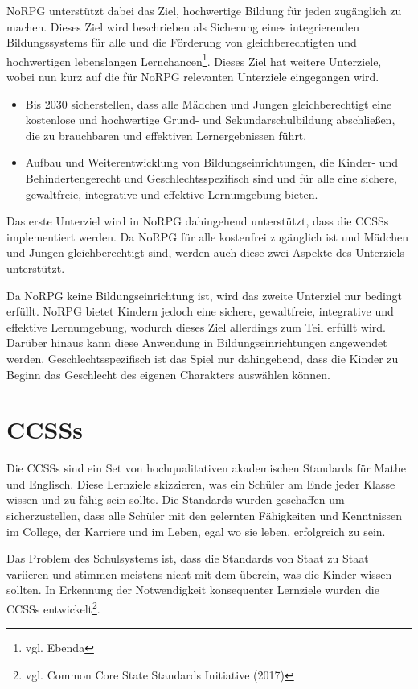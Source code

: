 NoRPG unterstützt dabei das Ziel, hochwertige Bildung für jeden zugänglich zu machen. Dieses Ziel wird beschrieben als Sicherung eines integrierenden Bildungssystems für alle und die Förderung von gleichberechtigten und hochwertigen lebenslangen Lernchancen\footnote{vgl. Ebenda}. Dieses Ziel hat weitere Unterziele, wobei nun kurz auf die für NoRPG relevanten Unterziele eingegangen wird.

\begin{itemize}
\item Bis 2030 sicherstellen, dass alle Mädchen und Jungen gleichberechtigt eine kostenlose und hochwertige Grund- und Sekundarschulbildung abschließen, die zu brauchbaren und effektiven Lernergebnissen führt.

\item Aufbau und Weiterentwicklung von Bildungseinrichtungen, die Kinder- und Behindertengerecht und Geschlechtsspezifisch sind und für alle eine sichere, gewaltfreie, integrative und effektive Lernumgebung bieten.
\end{itemize}

Das erste Unterziel wird in NoRPG dahingehend unterstützt, dass die \acfp{CCSS} implementiert werden. Da NoRPG für alle kostenfrei zugänglich ist und Mädchen und Jungen gleichberechtigt sind, werden auch diese zwei Aspekte des Unterziels unterstützt. 

Da NoRPG keine Bildungseinrichtung ist, wird das zweite Unterziel nur bedingt erfüllt. NoRPG bietet Kindern jedoch eine sichere, gewaltfreie, integrative und effektive Lernumgebung, wodurch dieses Ziel allerdings zum Teil erfüllt wird. Darüber hinaus kann diese Anwendung in Bildungseinrichtungen angewendet werden. Geschlechtsspezifisch ist das Spiel nur dahingehend, dass die Kinder zu Beginn das Geschlecht des eigenen Charakters auswählen können.

\section{\aclp{CCSS}}
Die \acp{CCSS} sind ein Set von hochqualitativen akademischen Standards für Mathe und Englisch. Diese Lernziele skizzieren, was ein Schüler am Ende jeder Klasse wissen und zu fähig sein sollte. Die Standards wurden geschaffen um sicherzustellen, dass alle Schüler mit den gelernten Fähigkeiten und Kenntnissen im College, der Karriere und im Leben, egal wo sie leben, erfolgreich zu sein.

Das Problem des Schulsystems ist, dass die Standards von Staat zu Staat variieren und stimmen meistens nicht mit dem überein, was die Kinder wissen sollten. In Erkennung der Notwendigkeit konsequenter Lernziele wurden die \acp{CCSS} entwickelt\footnote{vgl. Common Core State Standards Initiative \cite{ccss1} (2017)}.

